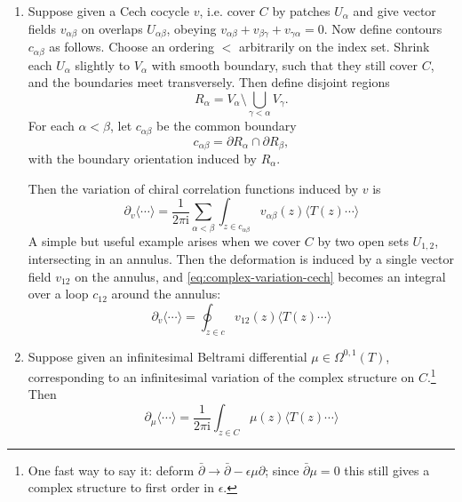 \documentclass[12pt,letterpaper,reqno]{amsart}
\numberwithin{equation}{section}
\newcommand{\I}{{\mathrm i}}
\newcommand{\IP}[1]{\langle#1\rangle}
\begin{document}
\begin{enumerate}
\item Suppose given a Cech cocycle $v$, i.e. cover $C$ by patches $U_\alpha$ and give
vector fields $v_{\alpha \beta}$ on overlaps $U_{\alpha \beta}$, obeying
$v_{\alpha \beta} + v_{\beta \gamma} + v_{\gamma \alpha} = 0$.
Now define contours $c_{\alpha \beta}$ as follows.
Choose an ordering $<$ arbitrarily on the index set.
Shrink each $U_\alpha$ slightly to $V_\alpha$ with smooth boundary, such that they still cover $C$, and the boundaries meet transversely.
Then define disjoint regions
\begin{equation}
  R_\alpha = V_\alpha \setminus \bigcup_{\gamma < \alpha} V_\gamma .
\end{equation}
For each $\alpha < \beta$, let $c_{\alpha \beta}$ be the 
common boundary
\begin{equation}
  c_{\alpha \beta} = \partial R_\alpha \cap \partial R_\beta ,
\end{equation}
with the boundary orientation induced by $R_\alpha$.

Then the variation of chiral correlation functions 
induced by $v$ is
\begin{equation} \label{eq:complex-variation-cech}
  \partial_v \IP{\cdots} = \frac{1}{2 \pi \I} \sum_{\alpha < \beta} \int_{z \in c_{\alpha \beta}} v_{\alpha \beta}(z) \IP{T(z) \cdots}
\end{equation}
A simple but useful example arises when we cover $C$ by two open sets $U_{1,2}$, intersecting in an annulus.
Then the deformation is induced by a single vector field $v_{12}$ on the annulus,
and \eqref{eq:complex-variation-cech} becomes an integral over a loop $c_{12}$ around the annulus:
\begin{equation}
  \partial_v \IP{\cdots} = \oint_{z \in c} v_{12}(z) \IP{T(z) \cdots}
\end{equation}

\item Suppose given an infinitesimal Beltrami differential $\mu \in \Omega^{0,1}(T)$, corresponding to an infinitesimal variation of
the complex structure on $C$.\footnote{One fast way to say it: deform $\bar\partial \to \bar\partial - \epsilon \mu \partial$;
since $\bar\partial \mu = 0$ this still gives a complex structure to first order in $\epsilon$.}
Then
\begin{equation} \label{eq:complex-variation-beltrami}
  \partial_\mu \IP{\cdots} = \frac{1}{2 \pi \I} \int_{z \in C} \mu(z) \IP{T(z) \cdots}
\end{equation}

\end{enumerate}
\end{document}
